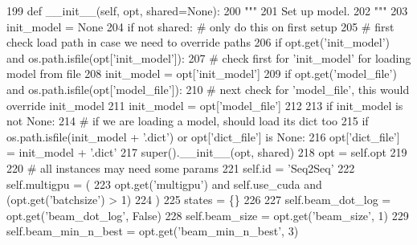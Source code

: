 \begin{DoxyCode}
199     \textcolor{keyword}{def }\_\_init\_\_(self, opt, shared=None):
200         \textcolor{stringliteral}{"""}
201 \textcolor{stringliteral}{        Set up model.}
202 \textcolor{stringliteral}{        """}
203         init\_model = \textcolor{keywordtype}{None}
204         \textcolor{keywordflow}{if} \textcolor{keywordflow}{not} shared:  \textcolor{comment}{# only do this on first setup}
205             \textcolor{comment}{# first check load path in case we need to override paths}
206             \textcolor{keywordflow}{if} opt.get(\textcolor{stringliteral}{'init\_model'}) \textcolor{keywordflow}{and} os.path.isfile(opt[\textcolor{stringliteral}{'init\_model'}]):
207                 \textcolor{comment}{# check first for 'init\_model' for loading model from file}
208                 init\_model = opt[\textcolor{stringliteral}{'init\_model'}]
209             \textcolor{keywordflow}{if} opt.get(\textcolor{stringliteral}{'model\_file'}) \textcolor{keywordflow}{and} os.path.isfile(opt[\textcolor{stringliteral}{'model\_file'}]):
210                 \textcolor{comment}{# next check for 'model\_file', this would override init\_model}
211                 init\_model = opt[\textcolor{stringliteral}{'model\_file'}]
212 
213             \textcolor{keywordflow}{if} init\_model \textcolor{keywordflow}{is} \textcolor{keywordflow}{not} \textcolor{keywordtype}{None}:
214                 \textcolor{comment}{# if we are loading a model, should load its dict too}
215                 \textcolor{keywordflow}{if} os.path.isfile(init\_model + \textcolor{stringliteral}{'.dict'}) \textcolor{keywordflow}{or} opt[\textcolor{stringliteral}{'dict\_file'}] \textcolor{keywordflow}{is} \textcolor{keywordtype}{None}:
216                     opt[\textcolor{stringliteral}{'dict\_file'}] = init\_model + \textcolor{stringliteral}{'.dict'}
217         super().\_\_init\_\_(opt, shared)
218         opt = self.opt
219 
220         \textcolor{comment}{# all instances may need some params}
221         self.id = \textcolor{stringliteral}{'Seq2Seq'}
222         self.multigpu = (
223             opt.get(\textcolor{stringliteral}{'multigpu'}) \textcolor{keywordflow}{and} self.use\_cuda \textcolor{keywordflow}{and} (opt.get(\textcolor{stringliteral}{'batchsize'}) > 1)
224         )
225         states = \{\}
226 
227         self.beam\_dot\_log = opt.get(\textcolor{stringliteral}{'beam\_dot\_log'}, \textcolor{keyword}{False})
228         self.beam\_size = opt.get(\textcolor{stringliteral}{'beam\_size'}, 1)
229         self.beam\_min\_n\_best = opt.get(\textcolor{stringliteral}{'beam\_min\_n\_best'}, 3)

\end{DoxyCode}
